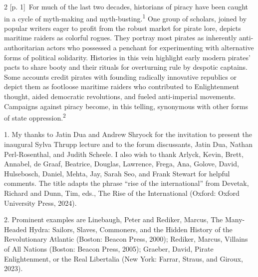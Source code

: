 \documentclass[10pt,a4paper]{article}
\begin{document}
\begin{paracol}{2}
{\scriptsize\color{gray} [p. 1]}\ For much of the last two decades, historians of piracy have been caught in a cycle of myth-making and myth-busting.\nobreak\textsuperscript{1} One group of scholars, joined by popular writers eager to profit from the robust market for pirate lore, depicts maritime raiders as colorful rogues. They portray most pirates as inherently anti-authoritarian actors who possessed a penchant for experimenting with alternative forms of political solidarity. Histories in this vein highlight early modern pirates’ pacts to share booty and their rituals for overturning rule by despotic captains. Some accounts credit pirates with founding radically innovative republics or depict them as footloose maritime raiders who contributed to Enlightenment thought, aided democratic revolutions, and fueled anti-imperial movements. Campaigns against piracy become, in this telling, synonymous with other forms of state oppression.\nobreak\textsuperscript{2}\par{\small 1. My thanks to Jatin Dua and Andrew Shryock for the invitation to present the inaugural Sylva Thrupp lecture and to the forum discussants, Jatin Dua, Nathan Perl-Rosenthal, and Judith Scheele. I also wish to thank Arlyck, Kevin, Brett, Annabel, de Graaf, Beatrice, Douglas, Lawrence, Frega, Ana, Golove, David, Hulsebosch, Daniel, Mehta, Jay, Sarah Seo, and Frank Stewart for helpful comments. The title adapts the phrase “rise of the international” from Devetak, Richard and Dunn, Tim, eds., The Rise of the International (Oxford: Oxford University Press, 2024).\par}{\small 2. Prominent examples are Linebaugh, Peter and Rediker, Marcus, The Many-Headed Hydra: Sailors, Slaves, Commoners, and the Hidden History of the Revolutionary Atlantic (Boston: Beacon Press, 2000); Rediker, Marcus, Villains of All Nations (Boston: Beacon Press, 2005); Graeber, David, Pirate Enlightenment, or the Real Libertalia (New York: Farrar, Straus, and Giroux, 2023).\par}
\switchcolumn*

\end{paracol}
\end{document}
